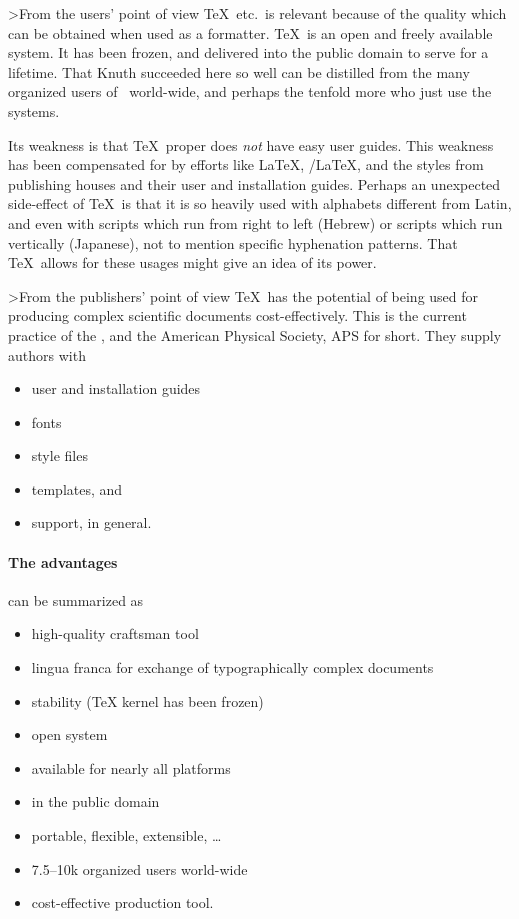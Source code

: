 >From the users' point of view \TeX\ etc.\
is relevant because of the quality which
can be obtained when used as a formatter.
\TeX\ is an open and freely available system.
It has been frozen, and delivered into the public domain to serve
for a lifetime.
That Knuth succeeded here so well can be distilled from the many organized
users of \AllTeX\ world-wide, and perhaps the tenfold more who
just use the systems.

Its weakness is that \TeX\ proper does {\em not\/} have easy user guides.
This weakness has been compensated for by efforts like \LaTeX,
\AmSTeX/\LaTeX, and the styles from publishing houses and their user and
installation guides.
Perhaps an unexpected side-effect of \TeX\ is that it is so heavily used
with alphabets different from Latin, and even with scripts
which run from right to left (Hebrew) or scripts which run vertically
(Japanese), not to mention specific hyphenation patterns.
That \TeX\ allows for these usages might give an idea of its power.

>From the publishers' point of view \TeX\ has the potential of being used
for producing complex scientific documents cost-effectively.
This is the current practice of the \AMS,
and the American Physical Society, APS for short.
They  supply authors with
\begin{itemize}
\item user and installation guides
\item fonts
\item style files
\item templates, and
\item support, in general.
\end{itemize}

\paragraph*{The advantages}can be summarized as
\begin{itemize}
\item high-quality craftsman tool
\item lingua franca for exchange of typographically complex documents
\item stability (\TeX{} kernel has been frozen)
\item open system
\item available for nearly all platforms
\item in the public domain
\item portable, flexible, extensible, \ldots
\item 7.5--10k organized users world-wide
\item cost-effective production tool.
\end{itemize}

